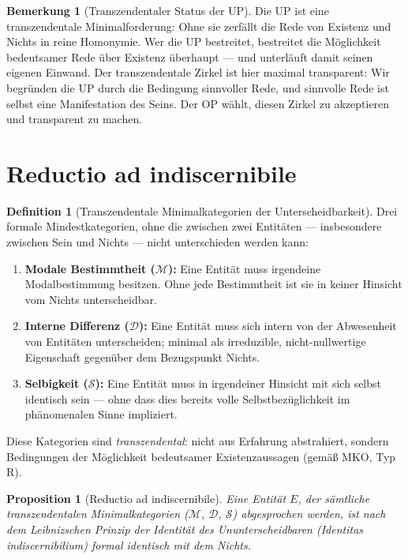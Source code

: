 \documentclass[11pt,a4paper]{article}
\theoremstyle{plain}
\newtheorem{proposition}{Proposition}[section]
\theoremstyle{definition}
\newtheorem{definition}{Definition}[section]
\newtheorem{remark}{Bemerkung}[section]
\begin{document}
\begin{remark}[Transzendentaler Status der UP]
Die UP ist eine transzendentale Minimalforderung: Ohne sie zerf\"{a}llt die Rede von
\glqq{}Existenz\grqq{} und \glqq{}Nichts\grqq{} in reine Homonymie. Wer die UP bestreitet,
bestreitet die M\"{o}glichkeit bedeutsamer Rede \"{u}ber Existenz \"{u}berhaupt --- und
unterl\"{a}uft damit seinen eigenen Einwand. Der transzendentale Zirkel ist hier maximal
transparent: Wir begr\"{u}nden die UP durch die Bedingung sinnvoller Rede, und sinnvolle
Rede ist selbst eine Manifestation des Seins. Der OP w\"{a}hlt, diesen Zirkel zu
akzeptieren und transparent zu machen.
\end{remark}

\section{Reductio ad indiscernibile}

\begin{definition}[Transzendentale Minimalkategorien der Unterscheidbarkeit]
Drei formale Mindestkategorien, ohne die zwischen zwei Entit\"{a}ten --- insbesondere
zwischen Sein und Nichts --- nicht unterschieden werden kann:
\begin{enumerate}[label=(\alph*)]
  \item \textbf{Modale Bestimmtheit ($\mathcal{M}$):} Eine Entit\"{a}t muss irgendeine
        Modalbestimmung besitzen. Ohne jede Bestimmtheit ist sie in keiner Hinsicht vom
        Nichts unterscheidbar.
  \item \textbf{Interne Differenz ($\mathcal{D}$):} Eine Entit\"{a}t muss sich intern
        von der Abwesenheit von Entit\"{a}ten unterscheiden; minimal als irreduzible,
        nicht-nullwertige Eigenschaft gegen\"{u}ber dem Bezugspunkt \glqq{}Nichts\grqq{}.
  \item \textbf{Selbigkeit ($\mathcal{S}$):} Eine Entit\"{a}t muss in irgendeiner Hinsicht
        mit sich selbst identisch sein --- ohne dass dies bereits volle
        Selbstbez\"{u}glichkeit im ph\"{a}nomenalen Sinne impliziert.
\end{enumerate}
Diese Kategorien sind \emph{transzendental}: nicht aus Erfahrung abstrahiert, sondern
Bedingungen der M\"{o}glichkeit bedeutsamer Existenzaussagen (gem\"{a}\ss{} MKO, Typ R).
\end{definition}

\begin{proposition}[Reductio ad indiscernibile]
Eine Entit\"{a}t $E$, der s\"{a}mtliche transzendentalen Minimalkategorien ($\mathcal{M}$,
$\mathcal{D}$, $\mathcal{S}$) abgesprochen werden, ist nach dem Leibnizschen Prinzip der
Identit\"{a}t des Ununterscheidbaren (\emph{Identitas indiscernibilium}) formal identisch
mit dem Nichts.
\end{proposition}
\end{document}
